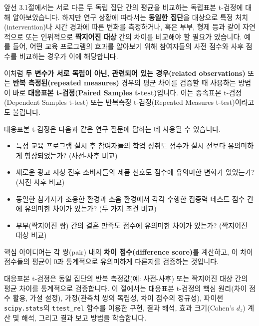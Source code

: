 \documentclass[
  letterpaper,
]{book}
\providecommand{\tightlist}{%
  \setlength{\itemsep}{0pt}\setlength{\parskip}{0pt}}
\begin{document}
앞선 3.1절에서는 서로 다른 두 독립 집단 간의 평균을 비교하는 독립표본
t-검정에 대해 알아보았습니다. 하지만 연구 상황에 따라서는 \textbf{동일한
집단}을 대상으로 특정 처치(intervention)나 시간 경과에 따른 변화를
측정하거나, 혹은 부부, 형제 등과 같이 자연적으로 또는 인위적으로
\textbf{짝지어진 대상} 간의 차이를 비교해야 할 필요가 있습니다. 예를
들어, 어떤 교육 프로그램의 효과를 알아보기 위해 참여자들의 사전 점수와
사후 점수를 비교하는 경우가 이에 해당합니다.

이처럼 \textbf{두 변수가 서로 독립이 아닌, 관련되어 있는 경우(related
observations)} 또는 \textbf{반복 측정된(repeated measures)} 경우의 평균
차이를 검증할 때 사용하는 방법이 바로 \textbf{대응표본 t-검정(Paired
Samples t-test)}입니다. 이는 종속표본 t-검정(Dependent Samples t-test)
또는 반복측정 t-검정(Repeated Measures t-test)이라고도 불립니다.

대응표본 t-검정은 다음과 같은 연구 질문에 답하는 데 사용될 수 있습니다.

\begin{itemize}
\tightlist
\item
  특정 교육 프로그램 실시 후 참여자들의 학업 성취도 점수가 실시 전보다
  유의미하게 향상되었는가? (사전-사후 비교)
\item
  새로운 광고 시청 전후 소비자들의 제품 선호도 점수에 유의미한 변화가
  있었는가? (사전-사후 비교)
\item
  동일한 참가자가 조용한 환경과 소음 환경에서 각각 수행한 집중력 테스트
  점수 간에 유의미한 차이가 있는가? (두 가지 조건 비교)
\item
  부부(짝지어진 쌍) 간의 결혼 만족도 점수에 유의미한 차이가 있는가?
  (짝지어진 대상 비교)
\end{itemize}

핵심 아이디어는 각 쌍(pair) 내의 \textbf{차이 점수(difference score)}를
계산하고, 이 차이 점수들의 평균이 0과 통계적으로 유의미하게 다른지를
검증하는 것입니다.

\begin{tcolorbox}[enhanced jigsaw, toprule=.15mm, opacitybacktitle=0.6, coltitle=black, colbacktitle=quarto-callout-note-color!10!white, colframe=quarto-callout-note-color-frame, left=2mm, colback=white, opacityback=0, bottomtitle=1mm, titlerule=0mm, toptitle=1mm, title=\textcolor{quarto-callout-note-color}{\faInfo}\hspace{0.5em}{📌 핵심 요약}, arc=.35mm, rightrule=.15mm, leftrule=.75mm, bottomrule=.15mm, breakable]

대응표본 t-검정은 동일 집단의 반복 측정값(예: 사전-사후) 또는 짝지어진
대상 간의 평균 차이를 통계적으로 검증합니다. 이 절에서는 대응표본
t-검정의 핵심 원리(차이 점수 활용, 가설 설정), 가정(관측치 쌍의 독립성,
차이 점수의 정규성), 파이썬 \texttt{scipy.stats}의 \texttt{ttest\_rel}
함수를 이용한 구현, 결과 해석, 효과 크기(Cohen's \(d_z\)) 계산 및 해석,
그리고 결과 보고 방법을 학습합니다.

\end{tcolorbox}
\end{document}
